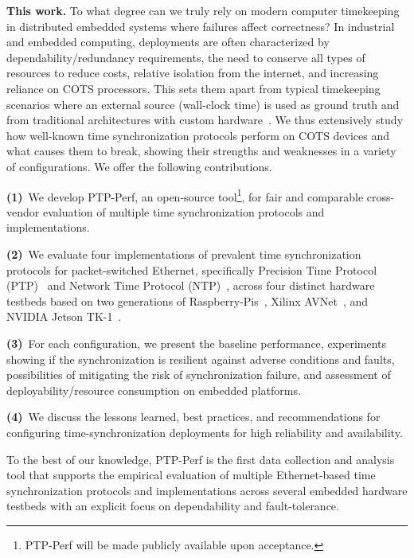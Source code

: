 \textbf{This work.}
To what degree can we truly rely on modern computer timekeeping in distributed embedded systems where failures affect correctness?
In industrial and embedded computing,
deployments are often characterized by dependability/redundancy requirements,
the need to conserve all types of resources to reduce costs,
relative isolation from the internet, %
and increasing reliance on COTS processors.
This sets them apart from typical timekeeping scenarios where an external source
(wall-clock time) is used as ground truth
and from traditional architectures with custom hardware~\cite{wensley1978sift,hopkins1978ftmp}.
We thus extensively study how well-known time synchronization protocols perform on COTS devices and what causes them to break,
showing their strengths and weaknesses in a variety of configurations.
We offer the following contributions.

\textbf{(1)}~We develop PTP-Perf, an open-source tool\footnote{PTP-Perf will be made publicly available upon acceptance.}, for fair and comparable cross-vendor evaluation of multiple time synchronization protocols and implementations.

\textbf{(2)}~We evaluate %
four implementations of prevalent time synchronization protocols for packet-switched Ethernet,
specifically Precision Time Protocol (PTP)~\cite{ptp-spec} and Network Time Protocol (NTP)~\cite{ntpv4-spec},
across four distinct hardware testbeds
based on two generations of Raspberry-Pis~\cite{??, ??},
Xilinx AVNet~\cite{??}, and NVIDIA Jetson TK-1~\cite{??}.

\textbf{(3)}~For each configuration,
we present the baseline performance, %
experiments showing if the synchronization is resilient against adverse
conditions and faults,
possibilities of mitigating the risk of synchronization failure,
and assessment of deployability/resource consumption on embedded platforms.

\textbf{(4)}~We discuss the lessons learned, best practices, and recommendations
for configuring time-synchronization deployments for high reliability and availability.

To the best of our knowledge, PTP-Perf is the first data collection and
analysis tool %
that supports the empirical evaluation of multiple Ethernet-based time
synchronization protocols and implementations across several embedded hardware
testbeds with an explicit focus on dependability and fault-tolerance.

